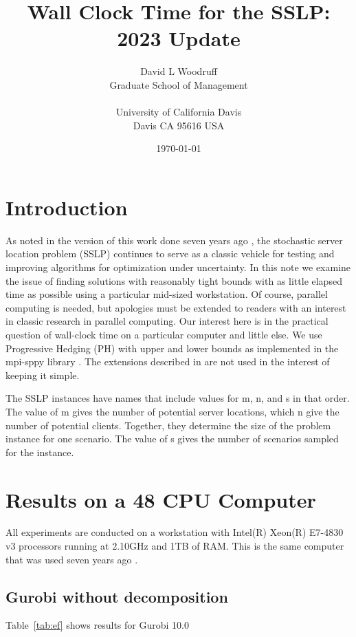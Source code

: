 \documentclass{article}
\title{Wall Clock Time for the SSLP: 2023 Update}
\author{  David L Woodruff\\
  Graduate School of Management\\
  \\
  University of California Davis\\
  Davis CA 95616 USA}
\date{\today}
\begin{document}
\maketitle


\section{Introduction}

As noted in the version of this work done seven years ago \cite{sslpfortime}, the stochastic server location problem (SSLP) \cite{sslp} continues to serve as a classic vehicle
for testing and improving algorithms for optimization under uncertainty. In this note we
examine the issue of finding solutions with reasonably tight bounds with as little elapsed
time as possible using a particular mid-sized workstation. Of course, parallel computing is needed, but apologies must be extended
to readers with an interest in classic research in parallel computing. Our interest here is
in the practical question of wall-clock time on a particular computer and little else.
We use Progressive Hedging (PH) \cite{ph} with upper and lower bounds as implemented in the mpi-sppy library \cite{mpisppy}. The extensions described in \cite{WW} are not used in the interest of keeping it simple.

The SSLP instances have names that include values for m, n, and s in that order. The value
of m gives the number of potential server locations, which n give the number of potential
clients. Together, they determine the size of the problem instance for one scenario. The
value of s gives the number of scenarios sampled for the instance.

\section{Results on a 48 CPU Computer}

All experiments are conducted on a workstation with  Intel(R) Xeon(R) E7-4830 v3 processors running at 2.10GHz
and 1TB of RAM.  This is the same computer that was used seven years ago \cite{sslpfortime}.

\subsection{Gurobi without decomposition}

Table~\ref{tab:ef} shows results for Gurobi 10.0 
\end{document}
